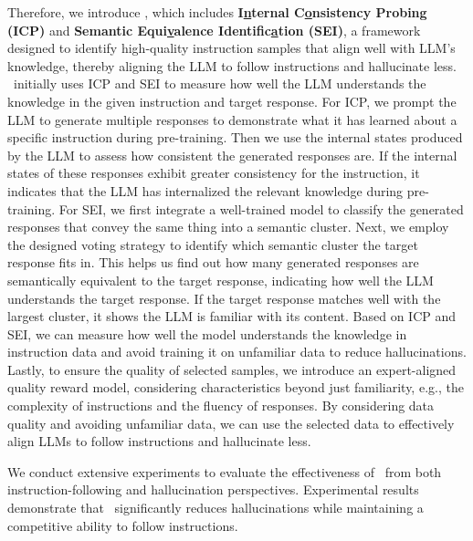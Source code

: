 Therefore, we introduce \textbf{\OURS}, which includes \textbf{I\underline{n}ternal C\underline{o}nsistency Probing (ICP)} and \textbf{Semantic Equi\underline{v}alence Identific\underline{a}tion (SEI)}, a framework designed to identify high-quality instruction samples that align well with LLM’s knowledge, thereby aligning the LLM to follow instructions and hallucinate less.
\OURS~initially uses ICP and SEI to measure how well the LLM understands the knowledge in the given instruction and target response. 
For ICP, we prompt the LLM to generate multiple responses to demonstrate what it has learned about a specific instruction during pre-training.
Then we use the internal states produced by the LLM to assess how consistent the generated responses are. 
If the internal states of these responses exhibit greater consistency for the instruction, it indicates that the LLM has internalized the relevant knowledge during pre-training.
For SEI, we first integrate a well-trained model to classify the generated responses that convey the same thing into a semantic cluster.
Next, we employ the designed voting strategy to identify which semantic cluster the target response fits in.
This helps us find out how many generated responses are semantically equivalent to the target response, indicating how well the LLM understands the target response.
If the target response matches well with the largest cluster, it shows the LLM is familiar with its content.
Based on ICP and SEI, we can measure how well the model understands the knowledge in instruction data and avoid training it on unfamiliar data to reduce hallucinations.
Lastly, to ensure the quality of selected samples, we introduce an expert-aligned quality reward model, considering characteristics beyond just familiarity, e.g., the complexity of instructions and the fluency of responses.
By considering data quality and avoiding unfamiliar data, we can use the selected data to effectively align LLMs to follow instructions and hallucinate less.

We conduct extensive experiments to evaluate the effectiveness of \OURS~from both instruction-following and hallucination perspectives.
Experimental results demonstrate that \OURS~significantly reduces hallucinations while maintaining a competitive ability to follow instructions.








